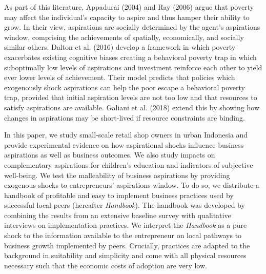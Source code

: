 \documentclass[11.5pt]{article}
\begin{document}

As part of this literature, Appadurai (2004) and Ray (2006) argue that poverty may affect the individual's capacity to aspire and thus hamper their ability to grow. In their view, aspirations are socially determined by the agent's aspirations window, comprising the achievements of spatially, economically, and socially similar others. Dalton et al. (2016) develop a framework in which poverty exacerbates existing cognitive biases creating a behavioral poverty trap in which suboptimally low levels of aspirations and investment reinforce each other to yield ever lower levels of achievement. Their model predicts that policies which exogenously shock aspirations can help the poor escape a behavioral poverty trap, provided that initial aspiration levels are not too low and that resources to satisfy aspirations are available. Galiani et al. (2018) extend this by showing how changes in aspirations may be short-lived if resource constraints are binding.

In this paper, we study small-scale retail shop owners in urban Indonesia and provide experimental evidence on how aspirational shocks influence business aspirations as well as business outcomes. We also study impacts on complementary aspirations for children's education and indicators of subjective well-being. We test the malleability of business aspirations by providing exogenous shocks to entrepreneurs' aspirations window. To do so, we distribute a handbook of profitable and easy to implement business practices used by successful local peers (hereafter \emph{Handbook}). The handbook was developed by combining the results from an extensive baseline survey with qualitative interviews on implementation practices. We interpret the \emph{Handbook} as a pure shock to the information available to the entrepreneur on local pathways to business growth implemented by peers. Crucially, practices are adapted to the background in suitability and simplicity and come with all physical resources necessary such that the economic costs of adoption are very low. 
\end{document}
